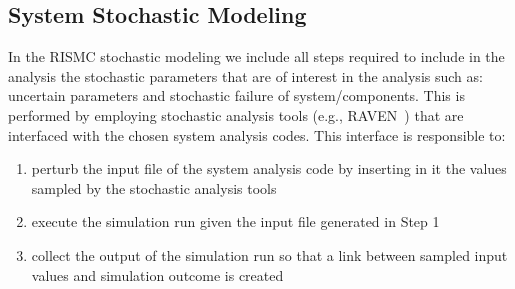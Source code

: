 \subsection{System Stochastic Modeling}
In the RISMC stochastic modeling we include all steps required to include in the analysis the 
stochastic parameters that are of interest in the analysis such as: uncertain parameters and stochastic 
failure of system/components.
This is performed by employing stochastic analysis tools (e.g., RAVEN~\cite{RAVEN_PSAM_2014}) that are 
interfaced with the chosen system analysis codes. This interface is responsible to:

\begin{enumerate}
  \item perturb the input file of the system analysis code by inserting in it the values sampled by the
        stochastic analysis tools
  \item execute the simulation run given the input file generated in Step 1
  \item collect the output of the simulation run so that a link between sampled input values and simulation 
        outcome is created      
\end{enumerate}


